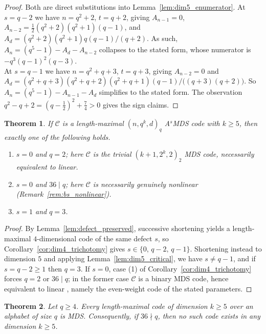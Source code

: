 \documentclass[12pt, letterpaper]{article}
\theoremstyle{plain}
\newtheorem{theorem}{Theorem}[section]
\theoremstyle{definition}
\begin{document}
	\begin{proof}
		Both are direct substitutions into Lemma~\ref{lem:dim5_enumerator}. At $s=q-2$ we have $n = q^2+2$, $t = q+2$, giving $A_{n-1}=0$, $A_{n-2} = \tfrac12(q^2+2)(q^2+1)(q-1)$, and $A_d = (q^2+2)(q^2+1)q(q-1)/(q+2)$. As such,  $A_n = (q^5-1) - A_d - A_{n-2}$ collapses to the stated form, whose numerator is $-q^3(q-1)^2(q-3)$. \\
		At $s=q-1$ we have $n = q^2+q+3$, $t = q+3$, giving $A_{n-2}=0$ and $A_d = (q^2+q+3)(q^2+q+2)(q^2+q+1)(q-1)/\bigl((q+3)(q+2)\bigr)$. So  $A_n = (q^5-1) - A_{n-1} - A_d$ simplifies to the stated form. The observation $q^2-q+2 = (q-\tfrac12)^2 + \tfrac74>0$ gives the sign claims.
	\end{proof}
	
		\begin{theorem}\label{thm:dim5existence}
		If $\mathcal{C}$ is a length-maximal $(n,q^k,d)_q$ A$^s$MDS code with $k\ge 5$, then exactly one of the following holds.
		\begin{enumerate}
			\item $s=0$ and $q=2$; here $\mathcal{C}$ is the trivial $(k+1,2^k,2)_2$ MDS code, necessarily equivalent to linear.
			\item $s=0$ and $36\mid q$; here $\mathcal{C}$ is necessarily genuinely nonlinear (Remark~\ref{rem:bs_nonlinear}).
			\item $s=1$ and $q=3$.
		\end{enumerate}
	\end{theorem}
	\begin{proof}
		By Lemma~\ref{lem:defect_preserved}, successive shortening yields a length-maximal $4$-dimensional code of the same defect $s$, so Corollary~\ref{cor:dim4_trichotomy} gives $s\in \{0,\, q-2,\, q-1\}$. Shortening instead to dimension $5$ and applying Lemma~\ref{lem:dim5_critical}, we have $s\ne q-1$, and if $s=q-2\ge 1$ then $q = 3$. If $s=0$, case (1) of Corollary~\ref{cor:dim4_trichotomy} forces $q=2$ or $36\mid q$; in the former case $\mathcal{C}$ is a binary MDS code, hence equivalent to linear \cite[Theorem~4]{Alderson2020}, namely the even-weight code of the stated parameters.
	\end{proof}

	\begin{theorem}\label{thm:dim5}
		Let $q \ge 4$. Every length-maximal code of dimension $k \ge 5$ over an alphabet of size $q$ is MDS. Consequently, if $36 \nmid q$, then no such code exists in any dimension $k \ge 5$.
	\end{theorem}
\end{document}
